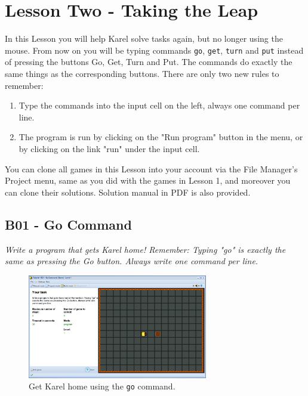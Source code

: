 \documentclass[article,A4,12pt]{llncs}
\begin{document}
\section{Lesson Two - Taking the Leap}

In this Lesson you will help Karel solve tasks again,
but no longer using the mouse. From now on you will be 
typing commands {\tt go}, {\tt get}, {\tt turn} and {\tt put} 
instead of pressing the buttons Go, Get, Turn and Put. The 
commands do exactly the same things as the corresponding buttons.  
There are only two new rules to remember:
\begin{enumerate} 
\item Type the commands into the input cell on the left, always one command per line.
\item The program is run by clicking on the "Run program" button in the menu, or by clicking 
      on the link "run" under the input cell.
\end{enumerate}
You can clone all games in this Lesson into your account via the File Manager's Project
menu, same as you did with the games in Lesson 1, and moreover you can clone their solutions. 
Solution manual in PDF is also provided. 

\subsection{B01 - Go Command}

{\em Write a program that gets Karel home! Remember: Typing "go" is exactly 
the same as pressing the Go button. Always write one command per line.}

\begin{figure}[!ht]
\begin{center}
\includegraphics[width=0.7\textwidth]{img/b01.png}
\end{center}
\vspace{-4mm}
\caption{Get Karel home using the {\tt go} command.}
\label{fig:b01}
\vspace{-4mm}
\end{figure}
\noindent
\end{document}
